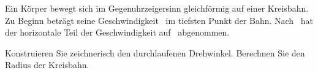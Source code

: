 Ein Körper bewegt sich im Gegenuhrzeigersinn gleichförmig auf einer Kreisbahn. Zu Beginn beträgt seine Geschwindigkeit \vkO\ im tiefsten Punkt der Bahn. Nach \tkO\ hat der horizontale Teil der Geschwindigkeit auf \vxeO\ abgenommen.
\begin{abcliste}
\abc Konstruieren Sie zeichnerisch den durchlaufenen Drehwinkel.
\abc Berechnen Sie den Radius der Kreisbahn.
\end{abcliste}
